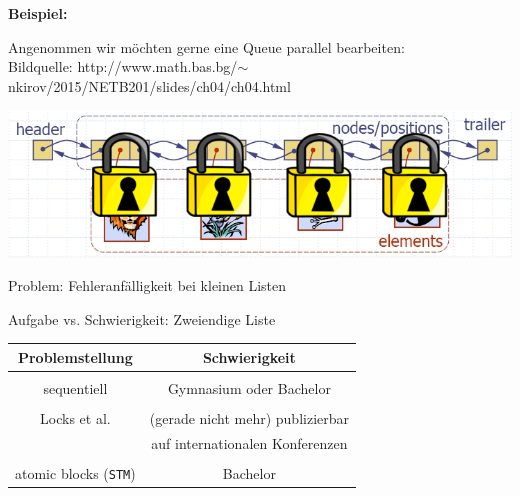 \documentclass{beamer}
\begin{document}

\begin{frame}

\textbf{Beispiel:}\bigskip

Angenommen wir möchten gerne eine Queue parallel bearbeiten:\\
\tiny Bildquelle: http://www.math.bas.bg/$\sim$nkirov/2015/NETB201/slides/ch04/ch04.html \normalsize

\begin{center}
\includegraphics[scale=0.35]{liste_individually_locked.jpg} 
\end{center}
\pause

Problem: Fehleranfälligkeit bei kleinen Listen

\end{frame}


\begin{frame}

Aufgabe vs. Schwierigkeit: Zweiendige Liste\bigskip

\begin{center}
\begin{tabular}{c|c}
Problemstellung & Schwierigkeit \\
\hline \\
sequentiell & Gymnasium oder Bachelor \pause \\ \\
Locks et al. & (gerade nicht mehr) publizierbar \\ & auf internationalen Konferenzen \pause \\ \\
atomic blocks (\texttt{STM}) & Bachelor
\end{tabular}
\end{center}

\end{frame}

\end{document}
